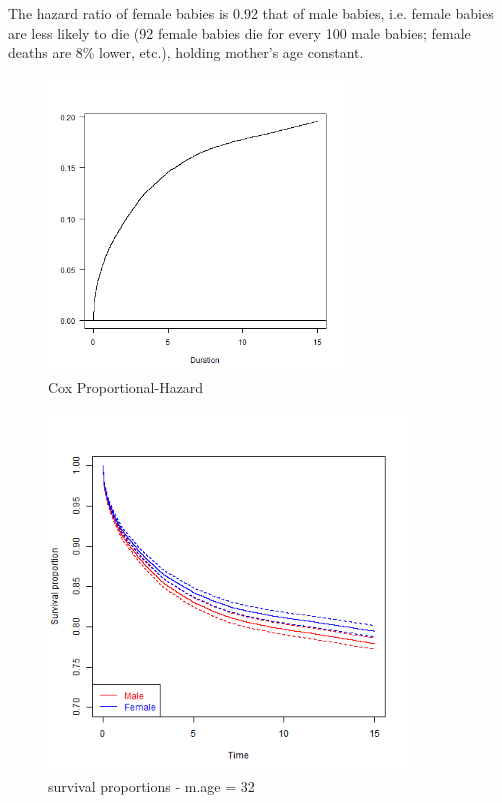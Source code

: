 \documentclass[12pt,letterpaper]{article}
\begin{document}
The hazard ratio of female babies is 0.92 that of male babies, i.e. female babies are less likely to die (92 female babies die for every 100 male babies; female deaths are 8\% lower, etc.), holding mother's age constant.  

  
  
\clearpage

  \begin{figure}[!htbp]
	  \includegraphics[width=0.7\textwidth,height=0.5\textheight]{graphics/coxreg.png}
	  \caption{Cox Proportional-Hazard}
	  \label{fig:cox}
	\end{figure}



  \begin{figure}[!htbp]
	  \includegraphics[width=0.85\textwidth]{graphics/surv_prop.png}
	  \caption{survival proportions - m.age = 32}
	  \label{fig:survprop}
	\end{figure}
\end{document}
